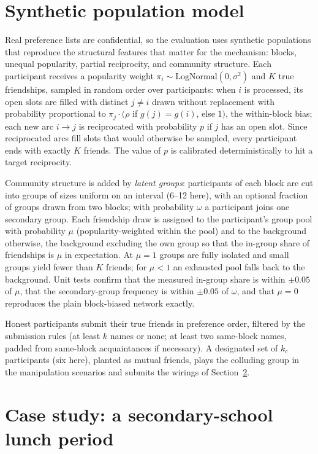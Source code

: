 \documentclass[11pt,a4paper]{article}
\theoremstyle{plain}
\theoremstyle{definition}
\theoremstyle{remark}
\begin{document}
\section{Synthetic population model}
\label{sec:population}

Real preference lists are confidential, so the evaluation uses synthetic populations that reproduce the structural features that matter for the mechanism: blocks, unequal popularity, partial reciprocity, and community structure. Each participant receives a popularity weight $\pi_i \sim \mathrm{LogNormal}(0, \sigma^2)$ and $K$ true friendships, sampled in random order over participants: when $i$ is processed, its open slots are filled with distinct $j \ne i$ drawn without replacement with probability proportional to $\pi_j \cdot (\rho$ if $g(j) = g(i)$, else $1)$, the within-block bias; each new arc $i \to j$ is reciprocated with probability $p$ if $j$ has an open slot. Since reciprocated arcs fill slots that would otherwise be sampled, every participant ends with exactly $K$ friends. The value of $p$ is calibrated deterministically to hit a target reciprocity.

Community structure is added by \emph{latent groups}: participants of each block are cut into groups of sizes uniform on an interval (6--12 here), with an optional fraction of groups drawn from two blocks; with probability $\omega$ a participant joins one secondary group. Each friendship draw is assigned to the participant's group pool with probability $\mu$ (popularity-weighted within the pool) and to the background otherwise, the background excluding the own group so that the in-group share of friendships is $\mu$ in expectation. At $\mu = 1$ groups are fully isolated and small groups yield fewer than $K$ friends; for $\mu < 1$ an exhausted pool falls back to the background. Unit tests confirm that the measured in-group share is within $\pm 0.05$ of $\mu$, that the secondary-group frequency is within $\pm 0.05$ of $\omega$, and that $\mu = 0$ reproduces the plain block-biased network exactly.

Honest participants submit their true friends in preference order, filtered by the submission rules (at least $k$ names or none; at least two same-block names, padded from same-block acquaintances if necessary). A designated set of $k_c$ participants (six here), planted as mutual friends, plays the colluding group in the manipulation scenarios and submits the wirings of Section~\ref{sec:case}.

\section{Case study: a secondary-school lunch period}
\label{sec:case}
\end{document}
